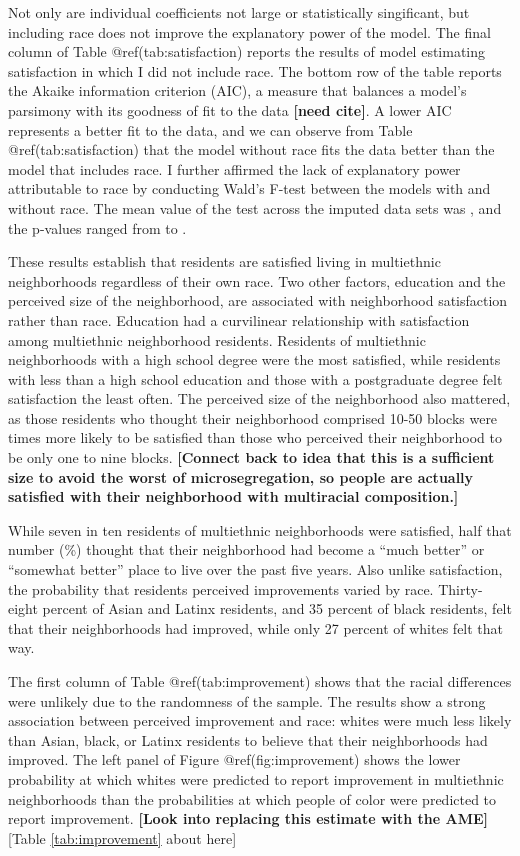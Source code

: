 \documentclass{baderart}
\begin{document}
Not only are individual coefficients not large or statistically singificant, but including race does not improve the explanatory power of the model. The final column of Table @ref(tab:satisfaction) reports the results of model estimating satisfaction in which I did not include race. The bottom row of the table reports the Akaike information criterion (AIC), a measure that balances a model's parsimony with its goodness of fit to the data \textbf{{[}need cite{]}}. A lower AIC represents a better fit to the data, and we can observe from Table @ref(tab:satisfaction) that the model without race fits the data better than the model that includes race. I further affirmed the lack of explanatory power attributable to race by conducting Wald's F-test between the models with and without race. The mean value of the test across the imputed data sets was \satWaldF, and the p-values ranged from \satWaldpMin to \satWaldpMax.

These results establish that residents are satisfied living in multiethnic neighborhoods regardless of their own race. Two other factors, education and the perceived size of the neighborhood, are associated with neighborhood satisfaction rather than race. Education had a curvilinear relationship with satisfaction among multiethnic neighborhood residents. Residents of multiethnic neighborhoods with a high school degree were the most satisfied, while residents with less than a high school education and those with a postgraduate degree felt satisfaction the least often. The perceived size of the neighborhood also mattered, as those residents who thought their neighborhood comprised 10-50 blocks were \satnhdsize times more likely to be satisfied than those who perceived their neighborhood to be only one to nine blocks. \textbf{{[}Connect back to idea that this is a sufficient size to avoid the worst of microsegregation, so people are actually satisfied with their neighborhood with multiracial composition.{]}}

While seven in ten residents of multiethnic neighborhoods were satisfied, half that number (\meanimproved \%) thought that their neighborhood had become a ``much better'' or ``somewhat better'' place to live over the past five years. Also unlike satisfaction, the probability that residents perceived improvements varied by race. Thirty-eight percent of Asian and Latinx residents, and 35 percent of black residents, felt that their neighborhoods had improved, while only 27 percent of whites felt that way.

The first column of Table @ref(tab:improvement) shows that the racial differences were unlikely due to the randomness of the sample. The results show a strong association between perceived improvement and race: whites were much less likely than Asian, black, or Latinx residents to believe that their neighborhoods had improved. The left panel of Figure @ref(fig:improvement) shows the lower probability at which whites were predicted to report improvement in multiethnic neighborhoods than the probabilities at which people of color were predicted to report improvement. \textbf{{[}Look into replacing this estimate with the AME{]}}
{[}Table \ref{tab:improvement} about here{]}
\end{document}
